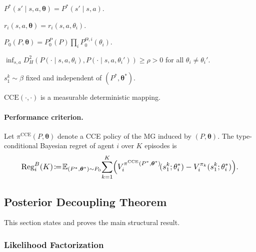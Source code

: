 \begin{assumption}[TI]\label{ass:TI}$P^*(s'\!\mid\! s,a,\boldsymbol\theta)=P^*(s'\!\mid\! s,a)$.\end{assumption}
\begin{assumption}[RL]\label{ass:RL}$r_i(s,a,\boldsymbol\theta)=r_i(s,a,\theta_i)$.\end{assumption}
\begin{assumption}[PF]\label{ass:PF}$P_0(P,\boldsymbol\theta)=P_0^P(P)\prod_i P_0^{\Theta,i}(\theta_i)$.\end{assumption}
\begin{assumption}[TID]\label{ass:TID}$\inf_{s,a}D_H^2(P(\cdot\!\mid\! s,a,\theta_i),P(\cdot\!\mid\! s,a,\theta_i'))\geq\rho>0$ for all $\theta_i\!\neq\!\theta_i'$.\end{assumption}
\begin{assumption}[ISI]\label{ass:ISI}$s_1^k\sim\beta$ fixed and independent of $(P^*,\boldsymbol\theta^*)$.\end{assumption}
\begin{assumption}[CSR]\label{ass:CSR}$\mathrm{CCE}(\cdot,\cdot)$ is a measurable deterministic mapping.\end{assumption}

\paragraph{Performance criterion.} Let $\pi^{\mathrm{CCE}}(P,\boldsymbol\theta)$ denote a CCE policy of the MG induced by $(P,\boldsymbol\theta)$. The type-conditional Bayesian regret of agent $i$ over $K$ episodes is
\begin{equation}\label{eq:regret-def}\resizebox{0.9\linewidth}{!}{$\displaystyle \mathrm{Reg}_i^B(K) \!\coloneqq\! \mathbb{E}_{(P^*,\boldsymbol\theta^*)\sim P_0}\!\sum_{k=1}^K\!\Big(V_i^{\pi^{\mathrm{CCE}}(P^*,\boldsymbol\theta^*)}\!(s_1^k;\theta_i^*) - V_i^{\pi_k}(s_1^k;\theta_i^*)\Big). $}\end{equation}

\subsection{Posterior Decoupling Theorem}
\label{sec:decoupling}

This section states and proves the main structural result.

\subsubsection{Likelihood Factorization}

